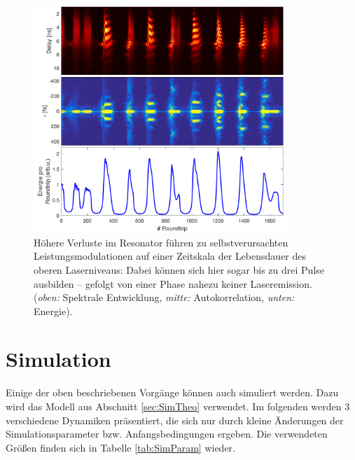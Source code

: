 \documentclass[bachelor,       %
               twoside,        %
               BCOR10mm,       %
               liststotoc,nomtotoc,bibtotoc, %
               english,ngerman, %
               final,          %
               ]{GAUBM}
\begin{document}
\begin{figure}[!htb]
   \centering
   \includegraphics[width=0.85\textwidth]{figures/4ms_25GSA_400m_MLrun_ZitternHeftig_239100}
   \caption{Höhere Verluste im Resonator führen zu selbstverursachten Leistungsmodulationen auf einer Zeitskala der Lebensdauer des oberen Laserniveaus:
   Dabei können sich hier sogar bis zu drei Pulse ausbilden -- gefolgt von einer Phase nahezu keiner Laseremission. 
   (\textit{oben:} Spektrale Entwicklung, \textit{mitte:} Autokorrelation, \textit{unten:} Energie).}
   \label{fig:SelfQSwitch}
\end{figure}


\section{Simulation}
Einige der oben beschriebenen Vorgänge können auch simuliert werden.
Dazu wird das Modell aus Abschnitt \ref{sec:SimTheo} verwendet.
Im folgenden werden 3 verschiedene Dynamiken präsentiert, die sich nur durch kleine Änderungen der Simulationsparameter bzw. Anfangsbedingungen ergeben.
Die verwendeten Größen finden sich in Tabelle \ref{tab:SimParam} wieder.
\end{document}
